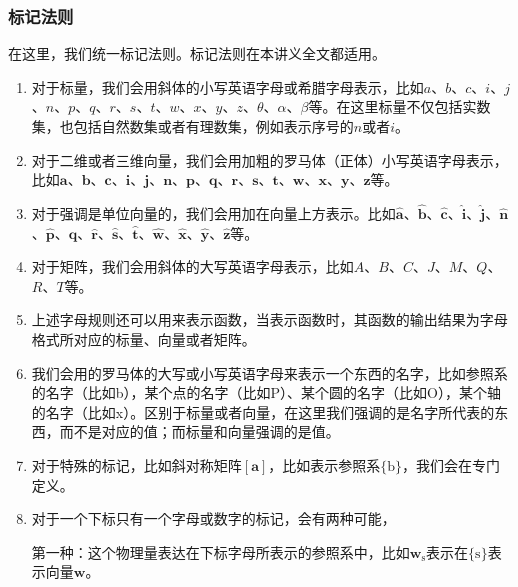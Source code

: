 \documentclass[12pt, a4paper, article, UTF8]{ctexart}
\begin{document}
\subsubsection{标记法则}
在这里，我们统一标记法则。标记法则在本讲义全文都适用。

\begin{enumerate}
\item 对于标量，我们会用斜体的小写英语字母或希腊字母表示，比如$a$、$b$、$c$、$i$、$j$、$n$、$p$、$q$、$r$、$s$、$t$、$w$、$x$、$y$、$z$、$\theta$、$\alpha$、$\beta$等。在这里标量不仅包括实数集，也包括自然数集或者有理数集，例如表示序号的$n$或者$i$。

\item 对于二维或者三维向量，我们会用加粗的罗马体（正体）小写英语字母表示，比如$\mathbf{a}$、$\mathbf{b}$、$\mathbf{c}$、$\mathbf{i}$、$\mathbf{j}$、$\mathbf{n}$、$\mathbf{p}$、$\mathbf{q}$、$\mathbf{r}$、$\mathbf{s}$、$\mathbf{t}$、$\mathbf{w}$、$\mathbf{x}$、$\mathbf{y}$、$\mathbf{z}$等。

\item 对于强调是单位向量的，我们会用$\hat{}$加在向量上方表示。比如$\hat{\mathbf{a}}$、$\hat{\mathbf{b}}$、$\hat{\mathbf{c}}$、$\hat{\mathbf{i}}$、$\hat{\mathbf{j}}$、$\hat{\mathbf{n}}$、$\hat{\mathbf{p}}$、$\hat{\mathbf{q}}$、$\hat{\mathbf{r}}$、$\hat{\mathbf{s}}$、$\hat{\mathbf{t}}$、$\hat{\mathbf{w}}$、$\hat{\mathbf{x}}$、$\hat{\mathbf{y}}$、$\hat{\mathbf{z}}$等。

\item 对于矩阵，我们会用斜体的大写英语字母表示，比如$A$、$B$、$C$、$J$、$M$、$Q$、$R$、$T$等。

\item 上述字母规则还可以用来表示函数，当表示函数时，其函数的输出结果为字母格式所对应的标量、向量或者矩阵。

\item 我们会用的罗马体的大写或小写英语字母来表示一个东西的名字，比如参照系的名字（比如b），某个点的名字（比如P）、某个圆的名字（比如O），某个轴的名字（比如x）。区别于标量或者向量，在这里我们强调的是名字所代表的东西，而不是对应的值；而标量和向量强调的是值。

\item 对于特殊的标记，比如斜对称矩阵$[\mathbf{a}]$，比如表示参照系$\{\text{b}\}$，我们会在专门定义。

\item 对于一个下标只有一个字母或数字的标记，会有两种可能，

第一种：这个物理量表达在下标字母所表示的参照系中，比如$\mathbf{w}_\text{s}$表示在$\{\text{s}\}$表示向量$\mathbf{w}$。


\end{enumerate}
\end{document}
